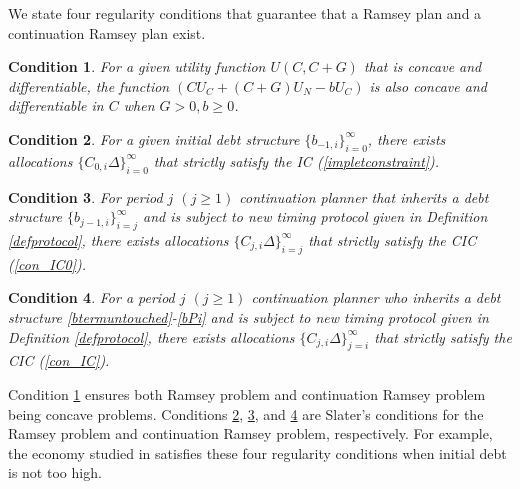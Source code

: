 \documentclass[12pt]{article}
\newtheorem{condition}{Condition}
\begin{document}
We  state four regularity conditions that guarantee that  a Ramsey plan and a continuation Ramsey plan exist. 

\begin{condition} \label{condition1}
For a given utility function $U(C, C+G)$ that is concave and differentiable, 
the function $\left(CU_C + (C+G) U_N - bU_C \right)$ is also concave and differentiable in $C$ when $G>0, b\geq 0$.
\end{condition}


\begin{condition} \label{condition2}
For a given initial debt structure $\{b_{-1, i}\}_{i=0}^\infty$, there exists allocations $\{C_{0, i}\Delta\}_{i=0}^\infty$ that strictly satisfy the IC (\ref{impletconstraint}). 
\end{condition}

\begin{condition} \label{condition2j}
For period $j$ $(j\geq 1)$ continuation planner that inherits a debt structure $\{b_{j-1, i}\}_{i=j}^\infty$ and is subject to new timing protocol given in Definition \ref{defprotocol}, there exists allocations $\{C_{j, i}\Delta\}_{i=j}^\infty$ that strictly satisfy the CIC (\ref{con_IC0}). 
\end{condition}

\begin{condition} \label{condition3}
For a period $j$ $(j\geq 1)$ continuation planner who inherits a debt structure \eqref{btermuntouched}-\eqref{bPi} and is subject to new timing protocol given in Definition \ref{defprotocol}, there exists allocations $\{C_{j, i}\Delta\}_{j=i}^\infty$ that strictly satisfy the CIC (\ref{con_IC}). 
\end{condition}
Condition \ref{condition1} ensures both Ramsey problem and continuation Ramsey problem being concave problems. Conditions \ref{condition2}, \ref{condition2j}, and \ref{condition3} are Slater's conditions for the Ramsey problem and continuation Ramsey problem, respectively.
For example, the economy studied in \citet{debortoli2021optimal} satisfies these four regularity conditions when initial debt is not too high. 
\end{document}
